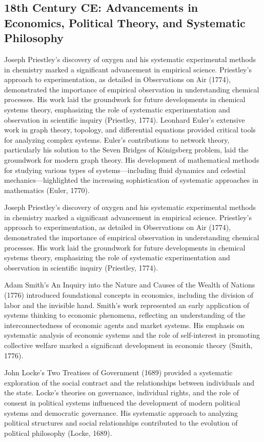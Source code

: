 \documentclass[twocolumn]{article}
\begin{document}
\subsection{18th Century CE: Advancements in Economics, Political Theory, and Systematic Philosophy}
Joseph Priestley’s discovery of oxygen and his systematic experimental methods in chemistry marked a significant advancement in empirical science. Priestley’s approach to experimentation, as detailed in Observations on Air (1774), demonstrated the importance of empirical observation in understanding chemical processes. His work laid the groundwork for future developments in chemical systems theory, emphasizing the role of systematic experimentation and observation in scientific inquiry (Priestley, 1774).
\textcolor{primary}{Leonhard Euler’s extensive work in graph theory, topology, and differential equations provided critical tools for analyzing complex systems. Euler’s contributions to network theory, particularly his solution to the Seven Bridges of Königsberg problem, laid the groundwork for modern graph theory. His development of mathematical methods for studying various types of systems—including fluid dynamics and celestial mechanics—highlighted the increasing sophistication of systematic approaches in mathematics (Euler, 1770).}


\textcolor{secondary}{Joseph Priestley’s discovery of oxygen and his systematic experimental methods in chemistry marked a significant advancement in empirical science. Priestley’s approach to experimentation, as detailed in Observations on Air (1774), demonstrated the importance of empirical observation in understanding chemical processes. His work laid the groundwork for future developments in chemical systems theory, emphasizing the role of systematic experimentation and observation in scientific inquiry (Priestley, 1774).}


\textcolor{primary}{Adam Smith’s An Inquiry into the Nature and Causes of the Wealth of Nations (1776) introduced foundational concepts in economics, including the division of labor and the invisible hand. Smith’s work represented an early application of systems thinking to economic phenomena, reflecting an understanding of the interconnectedness of economic agents and market systems. His emphasis on systematic analysis of economic systems and the role of self-interest in promoting collective welfare marked a significant development in economic theory (Smith, 1776).}

\textcolor{secondary}{John Locke’s Two Treatises of Government (1689) provided a systematic exploration of the social contract and the relationships between individuals and the state. Locke’s theories on governance, individual rights, and the role of consent in political systems influenced the development of modern political systems and democratic governance. His systematic approach to analyzing political structures and social relationships contributed to the evolution of political philosophy (Locke, 1689).}
\end{document}
